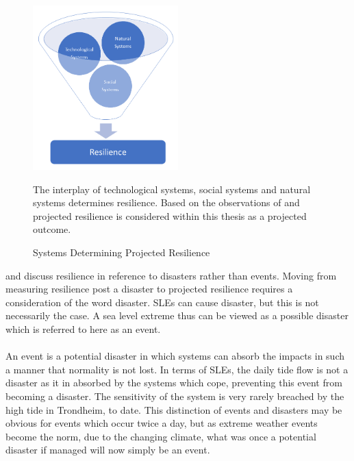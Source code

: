 \begin{figure}[!ht]
    \centering
    \includegraphics[width=0.5\textwidth]{fig_theory/resilience model .png}
    \caption{Systems Determining Projected Resilience}{The interplay of technological systems, social systems and natural systems determines resilience. Based on the observations of \cite{cutter_community_2020} and \cite{moser_turbulent_2019} projected resilience is considered within this thesis as a projected outcome.}
    \label{fig:projected_resilience}
\end{figure}

\cite{cutter_place-based_2008} and \cite{cutter_community_2020} discuss resilience in reference to disasters rather than events. Moving from measuring resilience post a disaster to projected resilience requires a consideration of the word disaster. SLEs can cause disaster, but this is not necessarily the case. A sea level extreme thus can be viewed as a possible disaster which is referred to here as an event. 
\paragraph{}
An event is a potential disaster in which systems can absorb the impacts in such a manner that normality is not lost. In terms of SLEs, the daily tide flow is not a disaster as it in absorbed by the systems which cope, preventing this event from becoming a disaster. The sensitivity of the system is very rarely breached by the high tide in Trondheim, to date. This distinction of events and disasters may be obvious for events which occur twice a day, but as extreme weather events become the norm, due to the changing climate, what was once a potential disaster if managed will now simply be an event. 
\paragraph{}


